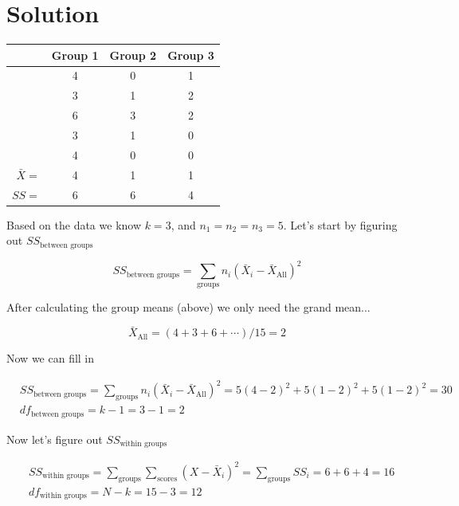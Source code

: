 \documentclass{tufte-handout}
\begin{document}
\pagebreak
\section{Solution}

\begin{fullwidth}
\begin{table}
  \centering
  \selectfont
  \begin{tabular}{rccc}
    \toprule
    & Group 1 & Group 2 & Group 3\\
    \midrule
&4&	0&	1\\
&3&	1&	2\\
&6&	3&	2\\
&3&	1&	0\\
&4&	0&	0\\
\midrule
$\bar{X}=$&4&1&1\\
$SS=$&6&6&4\\
    \bottomrule
  \end{tabular}
  \label{tab:normaltab}
\end{table}
\vspace{20pt}
Based on the data we know $k=3$, and $n_1=n_2=n_3=5$. Let's start by figuring out $SS_{\text{between groups}}$

\begin{equation*}
SS_{\text{between groups}}=\sum_{\text{groups}} n_i(\bar{X}_i-\bar{X}_{\text{All}})^2
\end{equation*}

After calculating the group means (above) we only need the grand mean...

\begin{equation*}
\bar{X}_{\text{All}}=(4+3+6+\cdots)/15=2
\end{equation*}

Now we can fill in

\begin{align*}
&SS_{\text{between groups}}=\sum_{\text{groups}} n_i(\bar{X}_i-\bar{X}_{\text{All}})^2 = 5(4-2)^2+5(1-2)^2+5(1-2)^2=30\\
&df_{\text{between groups}} = k-1 = 3-1=2
\end{align*}

Now let's figure out $SS_{\text{within groups}}$

\begin{align*}
&SS_{\text{within groups}}     =\sum_{\text{groups}} \sum_{\text{scores}} (X-\bar{X}_i)^2 = \sum_{\text{groups}} SS_i = 6+6+4=16\\
&df_{\text{within groups}}=N-k=15-3=12
\end{align*}


\end{fullwidth}
\end{document}
